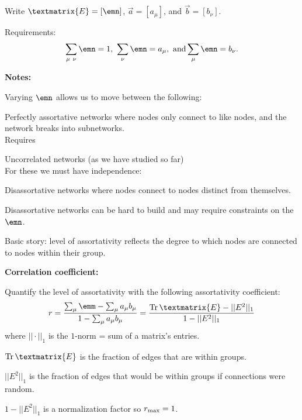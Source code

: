     Write $\textmatrix{E} = [\emn]$, $\vec{a} = [a_\mu]$, and $\vec{b} = [b_\nu]$.
  
    Requirements:
    $$
    \sum_{\mu\ \nu} \emn = 1,
    \
    \sum_{\nu} \emn = a_{\mu},
    \
    \mbox{and}
    \sum_{\mu} \emn = b_{\nu}.
    $$
  


  \textbf{Notes:}

  
   Varying $\emn$ allows us to move
    between the following:
    
     
      \alert{Perfectly assortative networks} where
      nodes only connect to like nodes, and the
      network breaks into subnetworks.\\
      {
        Requires 
      }
    
      \alert{Uncorrelated networks} (as we have studied so far)\\
      {
        For these we must have independence:
      }
    
      \alert{Disassortative networks} where nodes connect
      to nodes distinct from themselves.
    
  
    Disassortative networks can be hard to build
    and may require constraints on the $\emn$.
  
    Basic story: level of assortativity reflects
    the degree to which nodes are connected to
    nodes within their group.
  


  \textbf{Correlation coefficient:}

  
   Quantify the level of assortativity
    with the following \alert{assortativity coefficient}\cite{newman2003e}:
    $$
    r = 
    \frac{
      \sum_{\mu} \emm - \sum_{\mu} a_{\mu} b_{\mu}
      }
    {
      1 - \sum_{\mu} a_{\mu} b_{\mu}
    }
    =
    \frac{
      {\textnormal{Tr}} \, \textmatrix{E} - || E^2 ||_1
    }
    {
      1 - || E^2 ||_1
    }
    $$
    where $|| \cdot ||_1$ is the $1$-norm = sum of a matrix's entries.
  
    ${\textnormal{Tr}} \, \textmatrix{E}$ is the fraction of edges that are within groups.
  
    $|| E^2 ||_1$ is the fraction of edges that would be within
    groups if connections were random.
  
    $1 - || E^2 ||_1$ is a normalization factor so $r_{\textnormal{max}} = 1$.
  

